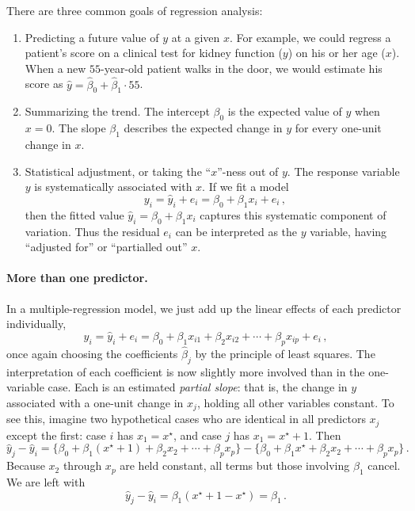 \documentclass[11pt]{article}
\newcommand{\1}[1]{\mathbf{1}_{\{ {#1} \}}}
\begin{document}
There are three common goals of regression analysis:
\begin{enumerate}[(1)]
\item Predicting a future value of $y$ at a given $x$.  For example, we could regress a patient's score on a clinical test for kidney function ($y$) on his or her age ($x$).  When a new $55$-year-old patient walks in the door, we would estimate his score as $\hat{y} = \hat{\beta}_0 + \hat{\beta}_1 \cdot 55$.
\item Summarizing the trend. The intercept $\beta_0$ is the expected value of $y$ when $x = 0$.  The slope $\beta_1$ describes the expected change in $y$ for every one-unit change in $x$.
\item Statistical adjustment, or taking the ``$x$''-ness out of $y$.  The response variable $y$ is systematically associated with $x$.  If we fit a model
$$
y_i = \hat{y}_i + e_i = \beta_0 + \beta_1 x_i + e_i \, ,
$$
then the fitted value $\hat{y}_i = \beta_0 + \beta_1 x_i $ captures this systematic component of variation.  Thus the residual $e_i$ can be interpreted as the $y$ variable, having ``adjusted for'' or ``partialled out'' $x$.
\end{enumerate}

\paragraph{More than one predictor.}
In a multiple-regression model, we just add up the linear effects of each predictor individually,
$$
y_i = \hat{y}_i + e_i = \beta_0 + \beta_1 x_{i1} + \beta_2 x_{i2} + \cdots + \beta_p x_{ip} + e_i \, ,
$$
once again choosing the coefficients $\hat{\beta}_j$ by the principle of least squares.  The interpretation of each coefficient is now slightly more involved than in the one-variable case.  Each is an estimated \textit{partial slope}: that is, the change in $y$ associated with a one-unit change in $x_j$, holding all other variables constant.  To see this, imagine two hypothetical cases who are identical in all predictors $x_j$ except the first: case $i$ has $x_1 = x^{\star}$, and case $j$ has $x_1= x^{\star} + 1$.  Then
$$
\hat{y}_j - \hat{y}_i = \{\beta_0 + \beta_1 (x^{\star} + 1) + \beta_2 x_{2} + \cdots + \beta_p x_{p} \} - 
 \{\beta_0 + \beta_1 x^{\star} + \beta_2 x_{2} + \cdots + \beta_p x_{p} \} \, .
$$
Because $x_2$ through $x_p$ are held constant, all terms but those involving $\beta_1$ cancel.  We are left with
$$
\hat{y}_j - \hat{y}_i  = \beta_1 ( x^{\star} + 1 - x^{\star}) = \beta_1 \, .
$$
\end{document}
